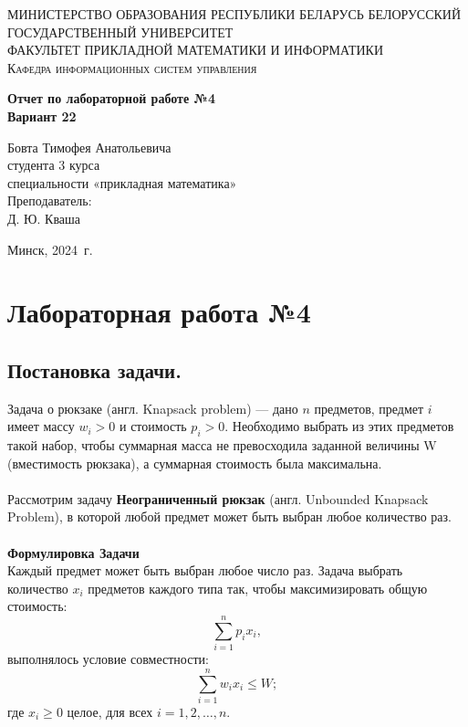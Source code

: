 \documentclass[a4paper, 12pt]{report}
\renewcommand{\leq}{\leqslant}
\renewcommand{\geq}{\geqslant}
\begin{document}
	\begin{titlepage}
		\begin{center}
			\textsc{МИНИСТЕРСТВО ОБРАЗОВАНИЯ РЕСПУБЛИКИ БЕЛАРУСЬ БЕЛОРУССКИЙ ГОСУДАРСТВЕННЫЙ УНИВЕРСИТЕТ
				\\[5mm]
				ФАКУЛЬТЕТ ПРИКЛАДНОЙ МАТЕМАТИКИ И ИНФОРМАТИКИ\\[2mm]
				Кафедра информационных систем управления
			}
			
			\vfill
			
			\textbf{Отчет по лабораторной работе №4\\
				Вариант 22
				\\[26mm]
			}
		\end{center}
		
		\hfill
		\begin{minipage}{.5\textwidth}
			\begin{flushright}
				Бовта Тимофея Анатольевича\\
				студента 3 курса\\
				специальности «прикладная математика»\\[5mm]
				
				Преподаватель:\\[2mm] 
				Д. Ю. Кваша\\
			\end{flushright}
		\end{minipage}%
		\vfill
		\begin{center}
			Минск, 2024\ г.
		\end{center}
	\end{titlepage}
	\newpage
	\section*{Лабораторная работа №4}
	\subsection*{Постановка задачи.}
	Задача о рюкзаке (англ. Knapsack problem) — дано $n$ предметов, предмет $i$ имеет массу
	$w_i > 0$ и стоимость $p_i > 0$. Необходимо выбрать из этих предметов такой набор, чтобы суммарная масса не превосходила заданной величины W (вместимость рюкзака), а суммарная
	стоимость была максимальна.\\\\
	Рассмотрим задачу \textbf{Неограниченный рюкзак} (англ. Unbounded Knapsack Problem), в
	которой любой предмет может быть выбран любое количество раз.\\\\
	\textbf{Формулировка Задачи}\\
	Каждый предмет может быть выбран любое число раз. Задача выбрать количество $x_i$
	предметов каждого типа так, чтобы
	максимизировать общую стоимость: $$\sum_{i=1}^n p_ix_i,$$
	выполнялось условие совместности: $$\sum_{i=1}^n w_ix_i \leq W;$$
	где $x_i \geq 0$ целое, для всех $i = 1, 2, \ldots , n.$
\end{document}
